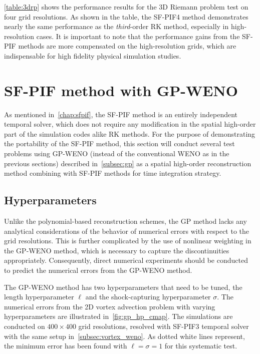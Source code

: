 \cref{table:3drp} shows the performance results for the 3D Riemann problem test
on four grid resolutions.
As shown in the table, the SF-PIF4 method demonstrates nearly the same performance
as the \textit{third}-order RK method, especially in high-resolution cases.
It is important to note that the performance gains from the SF-PIF methods
are more compensated on the high-resolution grids,
which are indispensable for high fidelity physical simulation studies.

\section{SF-PIF method with GP-WENO}\label{sec:result_gpweno}

As mentioned in~\cref{chap:sfpif}, the SF-PIF method is an entirely independent temporal solver,
which does not require any modification in the spatial high-order part of the simulation codes
alike RK methods.
For the purpose of demonstrating the portability of the SF-PIF method,
this section will conduct several test problems using GP-WENO
(instead of the conventional WENO as in the previous sections) described in~\cref{subsec:gp}
as a spatial high-order reconstruction method
combining with SF-PIF methods for time integration strategy.

\subsection{Hyperparameters}\label{subsec:hyper_params_gpweno}

Unlike the polynomial-based reconstruction schemes,
the GP method lacks any analytical considerations of the behavior of numerical errors
with respect to the grid resolutions.
This is further complicated by the use of nonlinear weighting in the GP-WENO method,
which is necessary to capture the discontinuities appropriately.
Consequently, direct numerical experiments
should be conducted to predict the numerical errors from the GP-WENO method.

The GP-WENO method has two hyperparameters that need to be tuned,
the length hyperparameter \( \ell \)
and the shock-capturing hyperparameter \( \sigma \).
The numerical errors from the 2D vortex advection problem
with varying hyperparameters are illustrated in~\cref{fig:gp_hp_cmap}.
The simulations are conducted on \( 400 \times 400 \) grid resolutions,
resolved with SF-PIF3 temporal solver
with the same setup in~\cref{subsec:vortex_weno}.
As dotted white lines represent,
the minimum error has been found with \( \ell = \sigma = 1\)
for this systematic test.

